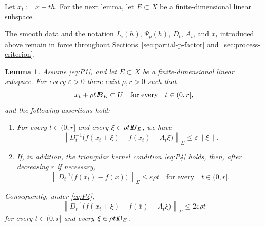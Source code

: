 \documentclass[11pt]{amsart}
\newtheorem{lemma}[theorem]{Lemma}
\theoremstyle{definition}
\theoremstyle{remark}
\newcommand{\bx}{\bar x}
\def\ball{{I\kern -.35em B}}
\begin{document}
	Let $x_t:=\bx+th.$
	For the next lemma, let $E\subset X$ be a finite-dimensional
	linear subspace.
	
	The smooth data and the notation $L_i(h)$, $\Psi_p(h)$, $D_t$, $A_t$, and
	$x_t$ introduced above remain in force throughout
	Sections~\ref{sec:partial-p-factor} and~\ref{sec:process-criterion}.
	
	\begin{lemma}
		\label{lem:p-factor-scaled-error}
		Assume \eqref{eq:P1}, and let $E\subset X$ be a finite-dimensional
		linear subspace. For every $\varepsilon>0$ there exist $\rho,r>0$ such
		that
		$$
		x_t+\rho t\ball_E\subset U
		\quad\text{for every}\quad t\in(0,r],
		$$
		and the following assertions hold:
		\begin{enumerate}[label={\rm (\roman*)}]
			
			\item For every $t\in(0,r]$ and every $\xi\in\rho t\ball_E$, we have
			\begin{equation}
				\left\|D_t^{-1}
				\bigl(f(x_t+\xi)-f(x_t)-A_t\xi\bigr)
				\right\|_\Sigma
				\le\varepsilon\|\xi\|.
				\label{eq:P7}
			\end{equation}
			
			\item If, in addition, the triangular kernel condition
			\eqref{eq:P4} holds, then, after decreasing $r$ if necessary,
			\begin{equation}
				\left\|D_t^{-1}
				\bigl(f(x_t)-f(\bx)\bigr)
				\right\|_\Sigma
				\le\varepsilon\rho t
				\quad\text{for every}\quad t\in(0,r].
				\label{eq:P10}
			\end{equation}
			
		\end{enumerate}
		Consequently, under \eqref{eq:P4},
		\begin{equation}
			\left\|D_t^{-1}
			\bigl(f(x_t+\xi)-f(\bx)-A_t\xi\bigr)
			\right\|_\Sigma
			\le 2\varepsilon\rho t
			\label{eq:centered-scaled-error}
		\end{equation}
		for every $t\in(0,r]$ and every $\xi\in\rho t\ball_E$.
	\end{lemma}
	
\end{document}
